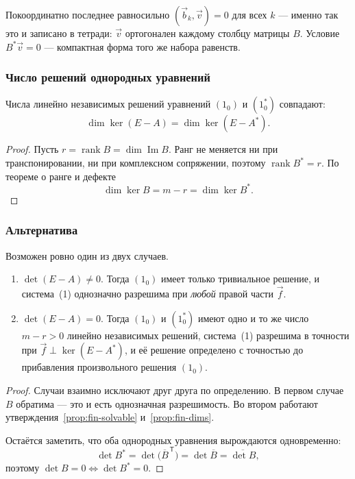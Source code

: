 \begin{idea}
Покоординатно последнее равносильно $(\vec b_k, \vec v) = 0$ для всех $k$ —
именно так это и записано в тетради: $\vec v$ ортогонален каждому столбцу
матрицы $B$. Условие $B^*\vec v = 0$ — компактная форма того же набора
равенств.
\end{idea}

\subsubsection*{Число решений однородных уравнений}

\begin{proposition}\label{prop:fin-dims}
Числа линейно независимых решений уравнений $(1_0)$ и $(1_0^*)$ совпадают:
\[
  \dim \ker (E - A) = \dim \ker (E - A^*) .
\]
\end{proposition}

\begin{proof}
Пусть $r = \operatorname{rank} B = \dim \operatorname{Im} B$. Ранг не меняется
ни при транспонировании, ни при комплексном сопряжении, поэтому
$\operatorname{rank} B^* = r$. По теореме о ранге и дефекте
\[
  \dim \ker B = m - r = \dim \ker B^* .
\]
\end{proof}

\subsubsection*{Альтернатива}

\begin{theorem}\label{thm:fin-alternative}
Возможен ровно один из двух случаев.
\begin{enumerate}[label=\arabic*), leftmargin=2em]
  \item $\det(E - A) \ne 0$. Тогда $(1_0)$ имеет только тривиальное решение,
        и система~(1) однозначно разрешима при \emph{любой} правой части
        $\vec f$.
  \item $\det(E - A) = 0$. Тогда $(1_0)$ и $(1_0^*)$ имеют одно и то же
        число $m - r > 0$ линейно независимых решений, система~(1) разрешима
        в точности при $\vec f \perp \ker(E - A^*)$, и её решение определено
        с точностью до прибавления произвольного решения $(1_0)$.
\end{enumerate}
\end{theorem}

\begin{proof}
Случаи взаимно исключают друг друга по определению. В первом случае $B$
обратима — это и есть однозначная разрешимость. Во втором работают
утверждения~\ref{prop:fin-solvable} и~\ref{prop:fin-dims}.

\medskip
Остаётся заметить, что оба однородных уравнения вырождаются одновременно:
\[
  \det B^* = \det\big(\overline{B}^{\,\mathsf{T}}\big)
           = \det \overline{B}
           = \overline{\det B} ,
\]
поэтому $\det B = 0 \iff \det B^* = 0$.
\end{proof}

